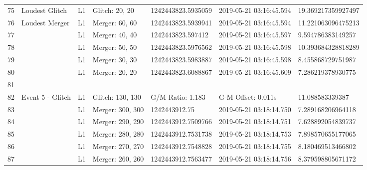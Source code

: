 \begin{longtable}{lllllll}
75   &                                     Loudest Glitch &       L1 &    Glitch: 20, 20 &  1242443823.5935059 &  2019-05-21 03:16:45.594 &  19.369217359927497 \\
76   &                                     Loudest Merger &       L1 &    Merger: 60, 60 &  1242443823.5939941 &  2019-05-21 03:16:45.594 &  11.221063096475213 \\
77   &                                                    &       L1 &    Merger: 40, 40 &   1242443823.597412 &  2019-05-21 03:16:45.597 &   9.594786383149257 \\
78   &                                                    &       L1 &    Merger: 50, 50 &  1242443823.5976562 &  2019-05-21 03:16:45.598 &  10.393684328818289 \\
79   &                                                    &       L1 &    Merger: 30, 30 &  1242443823.5983887 &  2019-05-21 03:16:45.598 &   8.455868729751987 \\
80   &                                                    &       L1 &    Merger: 20, 20 &  1242443823.6088867 &  2019-05-21 03:16:45.609 &   7.286219378930775 \\
81   &                                                    &          &                   &                     &                          &                     \\
82   &                                   Event 5 - Glitch &       L1 &  Glitch: 130, 130 &    G/M Ratio: 1.183 &       G-M Offset: 0.011s &     11.088583339387 \\
83   &                                                    &       L1 &  Merger: 300, 300 &       1242443912.75 &  2019-05-21 03:18:14.750 &   7.289168206964118 \\
84   &                                                    &       L1 &  Merger: 290, 290 &  1242443912.7509766 &  2019-05-21 03:18:14.751 &   7.628892054839737 \\
85   &                                                    &       L1 &  Merger: 280, 280 &  1242443912.7531738 &  2019-05-21 03:18:14.753 &   7.898570655177065 \\
86   &                                                    &       L1 &  Merger: 270, 270 &  1242443912.7548828 &  2019-05-21 03:18:14.755 &   8.180469513466802 \\
87   &                                                    &       L1 &  Merger: 260, 260 &  1242443912.7563477 &  2019-05-21 03:18:14.756 &   8.379598805671172 \\

\end{longtable}
